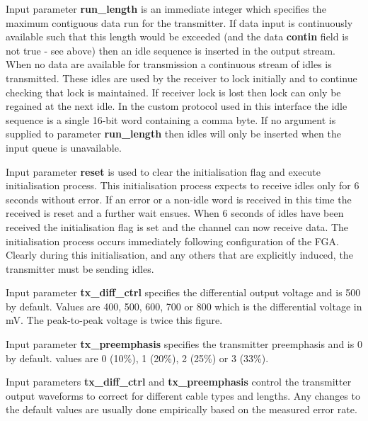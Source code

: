             Input parameter {\bf run\_length} is an immediate integer which
            specifies the maximum contiguous data run for the transmitter. If
            data input is continuously available such that this length would be
            exceeded (and the data {\bf contin} field is not true - see above)
            then an idle sequence is inserted in the output stream. When no data
            are available for transmission a continuous stream of idles is
            transmitted. These idles are used by the receiver to lock initially
            and to continue checking that lock is maintained. If receiver lock
            is lost then lock can only be regained at the next idle. In the
            custom protocol used in this interface the idle sequence is a single
            16-bit word containing a comma byte. If no argument is supplied
            to parameter {\bf run\_length} then idles will only be inserted
            when the input queue is unavailable.

            Input parameter {\bf reset} is used to clear the initialisation flag
            and execute initialisation process. This initialisation process
            expects to receive idles only for 6 seconds without error. If an
            error or a non-idle word is received in this time the received is
            reset and a further wait ensues. When 6 seconds of idles have been
            received the initialisation flag is set and the channel can now receive
            data. The initialisation process occurs immediately following
            configuration of the FGA. Clearly during this initialisation, and any
            others that are explicitly induced, the transmitter must be sending
            idles.

            Input parameter {\bf tx\_diff\_ctrl} specifies the differential
            output voltage and is 500 by default. Values are 400, 500, 600, 700
            or 800 which is the differential voltage in mV. The peak-to-peak
            voltage is twice this figure.

            Input parameter {\bf tx\_preemphasis} specifies the transmitter
            preemphasis and is 0 by default. values are 0 (10\%), 1 (20\%),
            2 (25\%) or 3 (33\%).

            Input parameters {\bf tx\_diff\_ctrl} and {\bf tx\_preemphasis} control
            the transmitter output waveforms to correct for different cable types
            and lengths. Any changes to the default values are usually done
            empirically based on the measured error rate.

